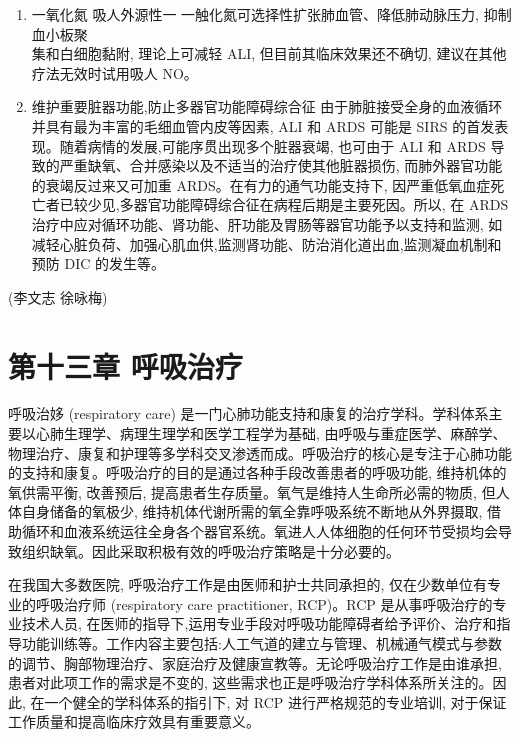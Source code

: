 \documentclass[10pt]{article}
\begin{document}
\begin{enumerate}
  \item 一氧化氮 吸人外源性一 一触化氮可选择性扩张肺血管、降低肺动脉压力, 抑制血小板聚\\
集和白细胞黏附, 理论上可减轻 ALI, 但目前其临床效果还不确切, 建议在其他疗法无效时试用吸人 NO。

  \item 维护重要脏器功能,防止多器官功能障碍综合征 由于肺脏接受全身的血液循环并具有最为丰富的毛细血管内皮等因素, ALI 和 ARDS 可能是 SIRS 的首发表现。随着病情的发展,可能序贯出现多个脏器衰竭, 也可由于 ALI 和 ARDS 导致的严重缺氧、合并感染以及不适当的治疗使其他脏器损伤, 而肺外器官功能的衰竭反过来又可加重 ARDS。在有力的通气功能支持下, 因严重低氧血症死亡者已较少见,多器官功能障碍综合征在病程后期是主要死因。所以, 在 ARDS 治疗中应对循环功能、肾功能、肝功能及胃肠等器官功能予以支持和监测, 如减轻心脏负荷、加强心肌血供,监测肾功能、防治消化道出血,监测凝血机制和预防 DIC 的发生等。

\end{enumerate}

(李文志 徐咏梅)

\section*{第十三章 呼吸治疗}
呼吸治姼 (respiratory care) 是一门心肺功能支持和康复的治疗学科。学科体系主要以心肺生理学、病理生理学和医学工程学为基础, 由呼吸与重症医学、麻醉学、物理治疗、康复和护理等多学科交叉渗透而成。呼吸治疗的核心是专注于心肺功能的支持和康复。呼吸治疗的目的是通过各种手段改善患者的呼吸功能, 维持机体的氧供需平衡, 改善预后, 提高患者生存质量。氧气是维持人生命所必需的物质, 但人体自身储备的氧极少, 维持机体代谢所需的氧全靠呼吸系统不断地从外界摄取, 借助循环和血液系统运往全身各个器官系统。氧进人人体细胞的任何环节受损均会导致组织缺氧。因此采取积极有效的呼吸治疗策略是十分必要的。

在我国大多数医院, 呼吸治疗工作是由医师和护士共同承担的, 仅在少数单位有专业的呼吸治疗师 (respiratory care practitioner, RCP)。RCP 是从事呼吸治疗的专业技术人员, 在医师的指导下,运用专业手段对呼吸功能障碍者给予评价、治疗和指导功能训练等。工作内容主要包括:人工气道的建立与管理、机械通气模式与参数的调节、胸部物理治疗、家庭治疗及健康宣教等。无论呼吸治疗工作是由谁承担, 患者对此项工作的需求是不变的, 这些需求也正是呼吸治疗学科体系所关注的。因此, 在一个健全的学科体系的指引下, 对 RCP 进行严格规范的专业培训, 对于保证工作质量和提高临床疗效具有重要意义。
\end{document}
